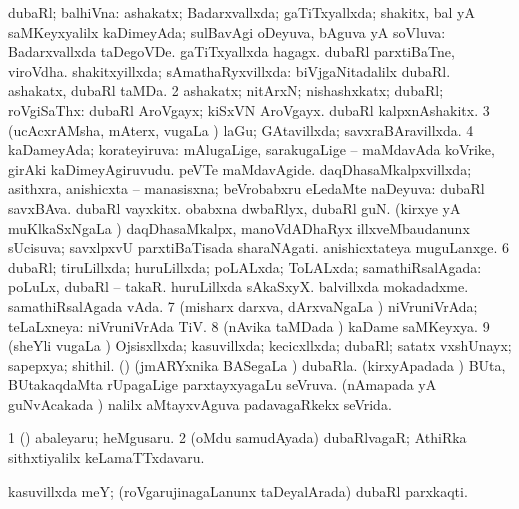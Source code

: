 { \bentry
{} 
\gl{\gu}
\expl{}
\bmng
\bnum
{} 
\banum
{} dubaRl; balhiVna: ashakatx; Badarxvallxda; gaTiTxyallxda; shakitx, bal yA saMKeyxyalilx kaDimeyAda; sulBavAgi oDeyuva, bAguva yA soVluva:  Badarxvallxda taDegoVDe.  gaTiTxyallxda hagagx.  dubaRl parxtiBaTne, viroVdha. 
 shakitxyillxda; sAmathaRyxvillxda:  biVjgaNitadalilx dubaRl.  ashakatx, dubaRl taMDa. 
\eanum
\numie
\num{2} ashakatx; nitArxN; nishashxkatx; dubaRl; roVgiSaThx:  dubaRl AroVgayx; kiSxVN AroVgayx.  dubaRl kalpxnAshakitx. 
\num{3} (ucAcxrAMsha, mAterx, \mo vugaLa \vi) laGu; GAtavillxda; savxraBAravillxda. 
\num{4} kaDameyAda; korateyiruva:  mAlugaLige, sarakugaLige -- maMdavAda koVrike, girAki kaDimeyAgiruvudu.  peVTe maMdavAgide. 
\banum
{} daqDhasaMkalpxvillxda; asithxra, anishicxta -- manasisxna; beVrobabxru eLedaMte naDeyuva:  dubaRl savxBAva.  dubaRl vayxkitx.  obabxna dwbaRlyx, dubaRl guN. 
 (kirxye yA muKlkaSxNgaLa \vi) daqDhasaMkalpx, manoVdADhaRyx illxveMbaudanunx sUcisuva;  savxlpxvU parxtiBaTisada sharaNAgati.  anishicxtateya muguLanxge. 
\eanum
\numie
\num{6} dubaRl; tiruLillxda; huruLillxda; poLALxda; ToLALxda; samathiRsalAgada:  poLuLx, dubaRl -- takaR.  huruLillxda sAkaSxyX.  balvillxda mokadadxme.  samathiRsalAgada vAda. 
\num{7} (misharx darxva, dArxvaNgaLa \vi) niVruniVrAda; teLaLxneya:  niVruniVrAda TiV. 
\num{8} (nAvika taMDada \vi) kaDame saMKeyxya. 
\num{9} (sheYli \mo vugaLa \vi) Ojsisxllxda; kasuvillxda; kecicxllxda; dubaRl; satatx vxshUnayx; sapepxya; shithil. 
 (\vAyx) (jmARYxnika BASegaLa \vi) dubaRla. 
\banum
{} (kirxyApadada \vi) BUta, BUtakaqdaMta rUpagaLige  parxtayxyagaLu seVruva. 
 (nAmapada yA guNvAcakada \vi)  nalilx aMtayxvAguva padavagaRkekx seVrida. 
\eanum
\numie
\enum
\emng

\noindent 
\gl{\pagu}
\expl{}
\bmng
\bnum
\num{1}  (\hiV) abaleyaru; heMgusaru. 
\num{2}  (oMdu samudAyada) dubaRlvagaR; AthiRka sithxtiyalilx keLamaTTxdavaru. 
\enum
\emng
\eentry

\bentry
{} 
\gl{\nA}
\expl{}
\bmng
kasuvillxda meY; (roVgarujinagaLanunx taDeyalArada) dubaRl parxkaqti. 
\emng
\eentry

}
